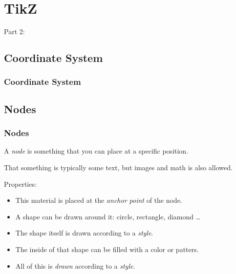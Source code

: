 
{
\renewcommand{\bgcolor}{tikz}

\section{TikZ}
\begin{frame}
  \vspace{25mm}
  \begin{center}
    \Huge{Part 2:\\\TikZ}
  \end{center}
\end{frame}

\subsection{Coordinate System}
\begin{frame}[fragile]
  \frametitle{Coordinate System}
  \vspace{3mm}
  \begin{center}
  \end{center}
\end{frame}

\subsection{Nodes}
\begin{frame}[fragile]
  \frametitle{Nodes}
  \vspace{3mm}
  A \textsl{node} is something that you can place at a specific position.
  
  \vspace{5mm}
  That something is typically some text, but images and math is also allowed.
  
  \pause
  \vspace{5mm}
  Properties:
  \begin{itemize}
    \item This material is placed at the \textsl{anchor point} of the node.
    \item A shape can be drawn around it: circle, rectangle, diamond \ldots
    \item The shape itself is drawn according to a \textsl{style}.
    \item The inside of that shape can be filled with a color or patters.
    \item All of this is \textsl{drawn} according to a \textsl{style}.
  \end{itemize}
\end{frame}

}
